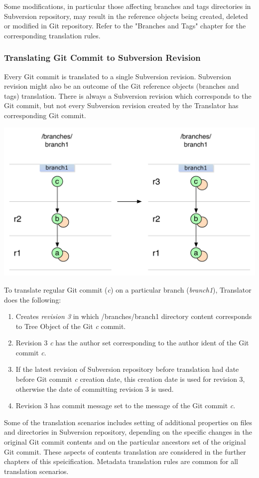 Some modifications, in particular those affecting branches and tags directories in Subversion repository, may
result in the reference objects being created, deleted or modified in Git repository. Refer to the "Branches and Tags" 
chapter for the corresponding translation rules.

\subsubsection{Translating Git Commit to Subversion Revision}
Every Git commit is translated to a single Subversion revision. Subversion revision might also be an outcome of 
the Git reference objects (branches and tags) translation. There is always a Subversion revision
which corresponds to the Git commit, but not every Subversion revision created by the Translator has 
corresponding Git commit.
\begin{center}
\includegraphics[width=\textwidth]{img/diagrams/single_change_git_to_svn.pdf}%
\label{single_change_git_to_svn}%
\end{center}

To translate regular Git commit (\emph{c}) on a particular branch (\emph{branch1}), Translator does 
the following:
\begin{enumerate}
	\compactlist
	\item Creates \emph{revision 3} in which /branches/branch1 directory content corresponds to Tree Object of the Git \emph{c} commit.
	\item Revision 3 \emph{c} has the author set corresponding to the author ident of the Git commit \emph{c}.
	\item If the latest revision of Subversion repository before translation had date before Git commit \emph{c} creation date, this creation date is used for revision 3, otherwise the date of committing revision 3 is used.
	\item Revision 3 has commit message set to the message of the Git commit \emph{c}.
\end{enumerate}

Some of the translation scenarios includes setting of additional properties on files and directories 
in Subversion repository, depending on the specific changes in the original Git commit contents and 
on the particular ancestors set of the original Git commit. These aspects of contents translation are considered in the further chapters of
this speicification. Metadata translation rules are common for all translation scenarios.